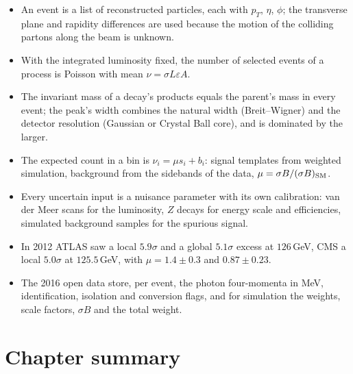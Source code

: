 \begin{recap}
\begin{itemize}[itemsep=1pt,leftmargin=1.2em]
  \item An event is a list of reconstructed particles, each with $p_T$, $\eta$, $\phi$; the transverse plane and rapidity differences are used because the motion of the colliding partons along the beam is unknown.
  \item With the integrated luminosity fixed, the number of selected events of a process is Poisson with mean $\nu=\sigma L\varepsilon A$.
  \item The invariant mass of a decay's products equals the parent's mass in every event; the peak's width combines the natural width (Breit--Wigner) and the detector resolution (Gaussian or Crystal Ball core), and is dominated by the larger.
  \item The expected count in a bin is $\nu_i=\mu s_i+b_i$: signal templates from weighted simulation, background from the sidebands of the data, $\mu=\sigma B/(\sigma B)_{\rm SM}$.
  \item Every uncertain input is a nuisance parameter with its own calibration: van der Meer scans for the luminosity, $Z$ decays for energy scale and efficiencies, simulated background samples for the spurious signal.
  \item In 2012 ATLAS saw a local $5.9\sigma$ and a global $5.1\sigma$ excess at $126$\,GeV, CMS a local $5.0\sigma$ at $125.5$\,GeV, with $\hat\mu=1.4\pm0.3$ and $0.87\pm0.23$.
  \item The 2016 open data store, per event, the photon four-momenta in MeV, identification, isolation and conversion flags, and for simulation the weights, scale factors, $\sigma B$ and the total weight.
\end{itemize}
\end{recap}

\section*{Chapter summary}
\label{T4a:sec:summary}

